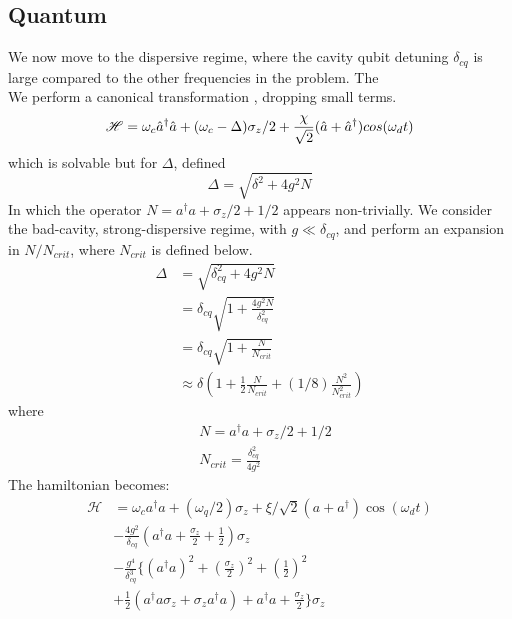 \subsection{Quantum}
We now move to the dispersive regime, where the cavity qubit detuning $\delta_{cq}$ is large compared to the other frequencies in the problem. 
The  
\begin{equation}
\end{equation}
We perform a canonical transformation \cite{Carbonaro1979}, dropping small terms.
\begin{equation}
\mathscr{H} = \omega_c \hat{a}^\dagger \hat{a} + ( \omega_c - \Delta ) \sigma_z /2 + \frac{\chi}{\sqrt{2}} (\hat{a} + \hat{a}^\dagger ) cos(\omega_d t)
\end{equation}
which is solvable but for $\Delta$, defined
\begin{equation}
        \Delta = \sqrt{\delta^2 +4 g ^2 N}
\end{equation}
In which the operator $N = a ^ \dagger a + \sigma_z/2 + 1/2$ appears non-trivially. 
We consider the bad-cavity, strong-dispersive regime, with $g\ll\delta_{cq}$, and perform an expansion in $N/N_{crit}$, where $N_{crit}$ is defined below.
\begin{align}
    \Delta &= \sqrt{\delta_{cq}^2 + 4g^2 N}\\
           &= \delta_{cq} \sqrt{1 + \frac{4g^2N}{\delta_{cq}^2}}\\
           &= \delta_{cq} \sqrt{1 + \frac{N}{N_{crit}}}\\
           & \approx \delta \left(
             1
             + \frac{1}{2}\frac{N}{N_{crit}}
             + (1/8) \frac{N^2}{N^2_{crit}}
             \right)
\end{align}
where 
\begin{align}
    &N = a ^ \dagger a + \sigma_z/2 + 1/2\\
    &N_{crit} = \frac{\delta_{cq}^2}{4g^2}
\end{align}
The hamiltonian becomes:
\begin{align}
    \mathscr{H} &= \omega_c a ^ \dagger a
    + (\omega_q/2) \sigma_z
    +  \xi/\sqrt{2} (a + a^\dagger) \cos(\omega_d t)\\
    &- \frac{4g^2}{\delta_{cq}}\left(a^\dagger a 
    +  \frac{\sigma_z}{2} + \frac{1}{2}\right)\sigma_z\\
    &- \frac{g^4}{\delta_{cq}^3}\Big\{
    \left(a^\dagger a\right)^2
    + \left(\frac{\sigma_z}{2}\right)^2
    + \left(\frac{1}{2}\right)^2\\
    &+ \frac{1}{2} \left(
                    a^\dagger a \sigma_z + \sigma_z a^\dagger a
                  \right)
    + a^\dagger a + \frac{\sigma_z}{2}
    \Big\} 
    \sigma_z
\end{align}
